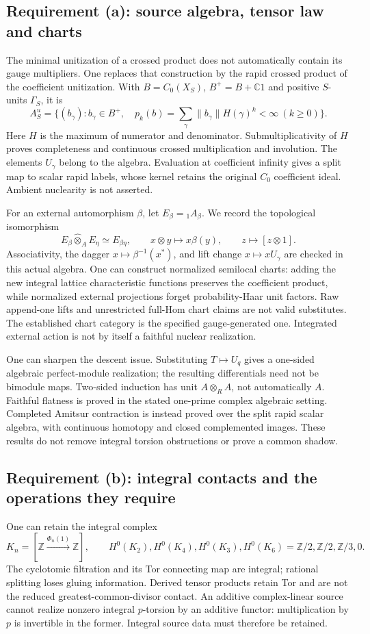 \documentclass[11pt]{amsart}
\theoremstyle{definition}
\theoremstyle{remark}
\newcommand{\C}{\mathbb C}
\newcommand{\Z}{\mathbb Z}
\begin{document}
\subsection{Requirement (a): source algebra, tensor law and charts}
The minimal unitization of a crossed product does not automatically
contain its gauge multipliers. One replaces that construction by
the rapid crossed product of the coefficient unitization. With
$B=C_0(X_S)$, $B^+=B+\C1$ and positive $S$-units $\Gamma_S$, it is
\[
 A_S^u=\{(b_\gamma):b_\gamma\in B^+,\quad
 p_k(b)=\sum_\gamma\|b_\gamma\|H(\gamma)^k<\infty\ (k\ge0)\}.
\]
Here $H$ is the maximum of numerator and denominator. Submultiplicativity
of $H$ proves completeness and continuous crossed multiplication and
involution. The elements $U_\gamma$ belong to the algebra. Evaluation
at coefficient infinity gives a split map to scalar rapid labels, whose
kernel retains the original $C_0$ coefficient ideal. Ambient nuclearity
is not asserted.

For an external automorphism $\beta$, let $E_\beta={}_1A_\beta$.
We record the topological isomorphism
\[
 E_\beta\widehat\otimes_A E_\eta\simeq E_{\beta\eta},
 \qquad x\otimes y\longmapsto x\beta(y),
 \qquad z\longmapsto[z\otimes1].
\]
Associativity, the dagger $x\mapsto\beta^{-1}(x^*)$, and lift change
$x\mapsto xU_\gamma$ are checked in this actual algebra.
One can construct normalized semilocal charts: adding the new
integral lattice characteristic functions preserves the coefficient
product, while normalized external projections forget probability-Haar
unit factors. Raw append-one lifts and unrestricted full-Hom chart
claims are not valid substitutes. The established chart category is
the specified gauge-generated one. Integrated external action is not
by itself a faithful nuclear realization.

One can sharpen the descent issue. Substituting $T\mapsto U_q$
gives a one-sided algebraic perfect-module realization; the resulting
differentials need not be bimodule maps. Two-sided induction has unit
$A\otimes_R A$, not automatically $A$. Faithful flatness is proved in
the stated one-prime complex algebraic setting. Completed Amitsur
contraction is instead proved over the split rapid scalar algebra, with
continuous homotopy and closed complemented images. These results do
not remove integral torsion obstructions or prove a common shadow.

\subsection{Requirement (b): integral contacts and the operations they require}
One can retain the integral complex
\[
 K_n=[\Z\xrightarrow{\Phi_n(1)}\Z],\qquad
 H^0(K_2),H^0(K_4),H^0(K_3),H^0(K_6)
 =\Z/2,\Z/2,\Z/3,0.
\]
The cyclotomic filtration and its Tor connecting map are integral;
rational splitting loses gluing information. Derived tensor products
retain Tor and are not the reduced greatest-common-divisor contact.
An additive complex-linear source cannot realize nonzero integral
$p$-torsion by an additive functor: multiplication by $p$ is invertible
in the former. Integral source data must therefore be retained.
\end{document}
